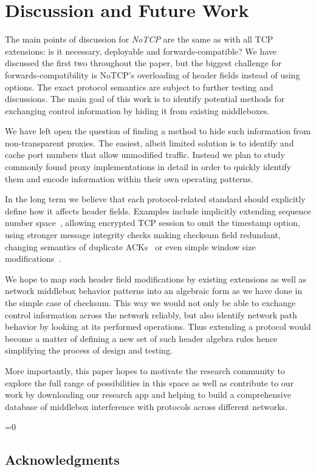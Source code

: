 \documentclass{sig-alternate-10pt}
\def\anon{1}        %
\begin{document}
\section{Discussion and Future Work}

The main points of discussion for \emph{NoTCP} are the same as with all TCP extensions: is it necessary, deployable and forwards-compatible? We have discussed the first two throughout the paper, but the biggest challenge for forwards-compatibility is NoTCP's overloading of header fields instead of using options. The exact protocol semantics are subject to further testing and discussions. The main goal of this work is to identify potential methods for exchanging control information by hiding it from existing middleboxes.

We have left open the question of finding a method to hide such information from non-transparent proxies. The easiest, albeit limited solution is to identify and cache port numbers that allow unmodified traffic. Instead we plan to study commonly found proxy implementations in detail in order to quickly identify them and encode information within their own operating patterns.

In the long term we believe that each protocol-related standard should explicitly define how it affects header fields. Examples include implicitly extending sequence number space~\cite{Mazieres:uz}, allowing encrypted TCP session to omit the timestamp option, using stronger message integrity checks making checksum field redundant, changing semantics of duplicate ACKs~\cite{Handley:vj,Flach:2013uy} or even simple window size modifications~\cite{Crowcroft:1998dk}.

We hope to map such header field modifications by existing extensions as well as network middlebox behavior patterns into an algebraic form as we have done in the simple case of checksum. This way we would not only be able to exchange control information across the network reliably, but also identify network path behavior by looking at its performed operations. Thus extending a protocol would become a matter of defining a new set of such header algebra rules hence simplifying the process of design and testing.

More importantly, this paper hopes to motivate the research community to explore the full range of possibilities in this space as well as contribute to our work by downloading our research app and helping to build a comprehensive database of middlebox interference with protocols across different networks.

\ifnum\anon=0
\subsection*{Acknowledgments}

\fi


{


\small 

}

%
\end{document}
